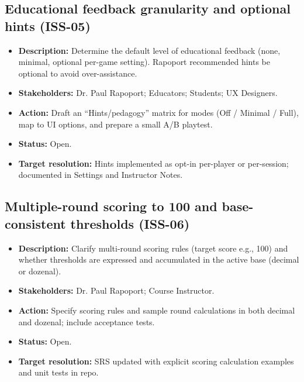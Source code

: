 \documentclass[12pt]{article}
\begin{document}
\subsection{Educational feedback granularity and optional hints (ISS-05)}
\begin{itemize}
  \item \textbf{Description:} Determine the default level of educational feedback (none, minimal, optional per-game setting). Rapoport recommended hints be optional to avoid over-assistance.
  \item \textbf{Stakeholders:} Dr. Paul Rapoport; Educators; Students; UX Designers.
  \item \textbf{Action:} Draft an “Hints/pedagogy” matrix for modes (Off / Minimal / Full), map to UI options, and prepare a small A/B playtest.
  \item \textbf{Status:} Open.
  \item \textbf{Target resolution:} Hints implemented as opt-in per-player or per-session; documented in Settings and Instructor Notes.
\end{itemize}

\subsection{Multiple-round scoring to 100 and base-consistent thresholds (ISS-06)}
\begin{itemize}
  \item \textbf{Description:} Clarify multi-round scoring rules (target score e.g., 100) and whether thresholds are expressed and accumulated in the active base (decimal or dozenal).
  \item \textbf{Stakeholders:} Dr. Paul Rapoport; Course Instructor.
  \item \textbf{Action:} Specify scoring rules and sample round calculations in both decimal and dozenal; include acceptance tests.
  \item \textbf{Status:} Open.
  \item \textbf{Target resolution:} SRS updated with explicit scoring calculation examples and unit tests in repo.
\end{itemize}
\end{document}
